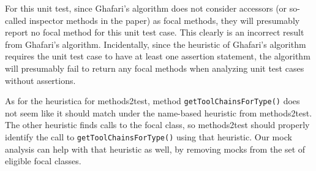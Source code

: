 For this unit test, since Ghafari's algorithm does not consider accessors (or so-called inspector methods in the paper) as focal methods, they will presumably report no focal method for this unit test case. This clearly is an incorrect result from Ghafari's algorithm.
Incidentally, since the heuristic of Ghafari's algorithm requires the unit test case to have at least one assertion statement, the algorithm will presumably fail to return any focal methods when analyzing unit test cases without assertions.

As for the heuristica for methods2test, method \texttt{getToolChainsForType()} does not seem like it should match under the name-based heuristic from methods2test. The other heuristic finds calls to the focal class, so methods2test should properly identify the call to \texttt{getToolChainsForType()} using that heuristic. Our mock analysis can help with that heuristic as well, by removing mocks from the set of eligible focal classes.

\begin{table*}
	\centering
	\caption{Comparison of \% of test cases with reported focal methods by the two automated focal method detection algorithms.}
	\vspace*{.5em}
	\label{tab:focal-method-algorithm-comparison}
\end{table*}


